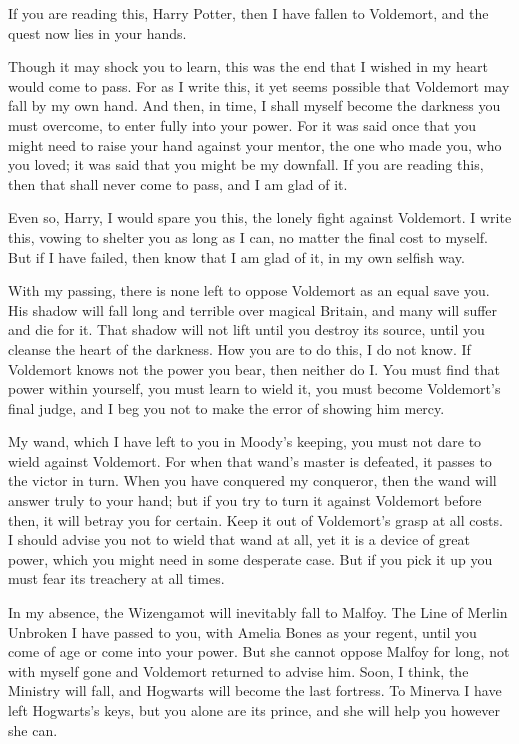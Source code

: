 \begin{writtenNote}
If you are reading this, Harry Potter, then I have fallen to Voldemort, and the quest now lies in your hands.

Though it may shock you to learn, this was the end that I wished in my heart would come to pass. For as I write this, it yet seems possible that Voldemort may fall by my own hand. And then, in time, I shall myself become the darkness you must overcome, to enter fully into your power. For it was said once that you might need to raise your hand against your mentor, the one who made you, who you loved; it was said that you might be my downfall. If you are reading this, then that shall never come to pass, and I am glad of it.

Even so, Harry, I would spare you this, the lonely fight against Voldemort. I write this, vowing to shelter you as long as I can, no matter the final cost to myself. But if I have failed, then know that I am glad of it, in my own selfish way.

With my passing, there is none left to oppose Voldemort as an equal save you. His shadow will fall long and terrible over magical Britain, and many will suffer and die for it. That shadow will not lift until you destroy its source, until you cleanse the heart of the darkness. How you are to do this, I do not know. If Voldemort knows not the power you bear, then neither do I\@. You must find that power within yourself, you must learn to wield it, you must become Voldemort's final judge, and I beg you not to make the error of showing him mercy.

My wand, which I have left to you in Moody's keeping, you must not dare to wield against Voldemort. For when that wand's master is defeated, it passes to the victor in turn. When you have conquered my conqueror, then the wand will answer truly to your hand; but if you try to turn it against Voldemort before then, it will betray you for certain. Keep it out of Voldemort's grasp at all costs. I should advise you not to wield that wand at all, yet it is a device of great power, which you might need in some desperate case. But if you pick it up you must fear its treachery at all times.

In my absence, the Wizengamot will inevitably fall to Malfoy. The Line of Merlin Unbroken I have passed to you, with Amelia Bones as your regent, until you come of age or come into your power. But she cannot oppose Malfoy for long, not with myself gone and Voldemort returned to advise him. Soon, I think, the Ministry will fall, and Hogwarts will become the last fortress. To Minerva I have left Hogwarts's keys, but you alone are its prince, and she will help you however she can.


\end{writtenNote}
